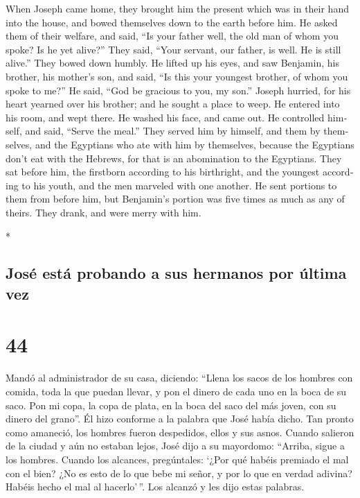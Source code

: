 \begin{paracol}{2}
\begin{otherlanguage}{english}
 When Joseph came home, they brought him the present
which was in their hand into the house, and bowed themselves down to the
earth before him.  He asked them of their welfare, and
said, ``Is your father well, the old man of whom you spoke? Is he yet
alive?''  They said, ``Your servant, our father, is well.
He is still alive.'' They bowed down humbly.  He lifted
up his eyes, and saw Benjamin, his brother, his mother's son, and said,
``Is this your youngest brother, of whom you spoke to me?'' He said,
``God be gracious to you, my son.''  Joseph hurried, for
his heart yearned over his brother; and he sought a place to weep. He
entered into his room, and wept there.  He washed his
face, and came out. He controlled himself, and said, ``Serve the meal.''
 They served him by himself, and them by themselves, and
the Egyptians who ate with him by themselves, because the Egyptians
don't eat with the Hebrews, for that is an abomination to the Egyptians.
 They sat before him, the firstborn according to his
birthright, and the youngest according to his youth, and the men
marveled with one another.  He sent portions to them from
before him, but Benjamin's portion was five times as much as any of
theirs. They drank, and were merry with him.

\end{otherlanguage}

\switchcolumn[0]*

\hypertarget{josuxe9-estuxe1-probando-a-sus-hermanos-por-uxfaltima-vez}{%
\subsection{José está probando a sus hermanos por última
vez}\label{josuxe9-estuxe1-probando-a-sus-hermanos-por-uxfaltima-vez}}

\hypertarget{section-86}{%
\section{44}\label{section-86}}

 Mandó al administrador de su casa, diciendo: ``Llena los
sacos de los hombres con comida, toda la que puedan llevar, y pon el
dinero de cada uno en la boca de su saco.  Pon mi copa, la
copa de plata, en la boca del saco del más joven, con su dinero del
grano''. Él hizo conforme a la palabra que José había dicho.
 Tan pronto como amaneció, los hombres fueron despedidos,
ellos y sus asnos.  Cuando salieron de la ciudad y aún no
estaban lejos, José dijo a su mayordomo: ``Arriba, sigue a los hombres.
Cuando los alcances, pregúntales: `¿Por qué habéis premiado el mal con
el bien?  ¿No es esto de lo que bebe mi señor, y por lo
que en verdad adivina? Habéis hecho el mal al hacerlo'\,''.
 Los alcanzó y les dijo estas palabras.


\end{paracol}
